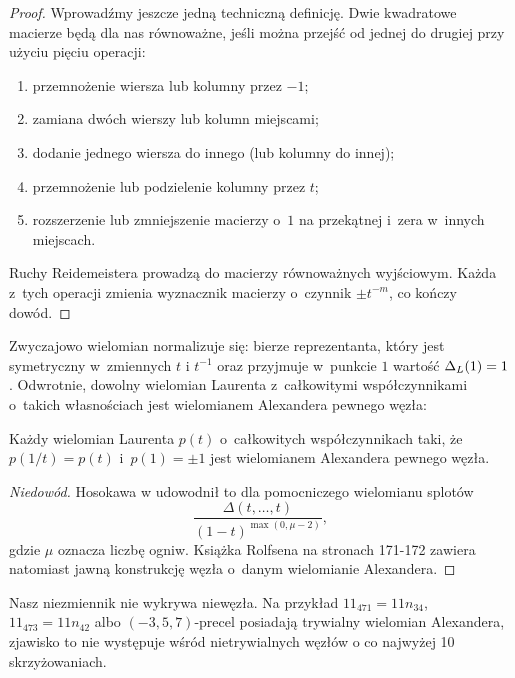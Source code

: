 \begin{proof}
    Wprowadźmy jeszcze jedną techniczną definicję.
    Dwie kwadratowe macierze będą dla nas równoważne, jeśli można przejść od jednej do drugiej przy użyciu pięciu operacji:
    \begin{enumerate}
        \item przemnożenie wiersza lub kolumny przez $-1$;
        \item zamiana dwóch wierszy lub kolumn miejscami;
        \item dodanie jednego wiersza do innego (lub kolumny do innej);
        \item przemnożenie lub podzielenie kolumny przez $t$;
        \item rozszerzenie lub zmniejszenie macierzy o~$1$ na przekątnej i~zera w~innych miejscach.
    \end{enumerate}

    Ruchy Reidemeistera prowadzą do macierzy równoważnych wyjściowym.
    Każda z~tych operacji zmienia wyznacznik macierzy o~czynnik $\pm t^{-m}$, co kończy dowód.
\end{proof}

Zwyczajowo wielomian normalizuje się: bierze reprezentanta, który jest symetryczny w~zmiennych $t$ i $t^{-1}$ oraz przyjmuje w~punkcie $1$ wartość $\Delta_L(1) = 1$.
Odwrotnie, dowolny wielomian Laurenta z~całkowitymi współczynnikami o~takich własnościach jest wielomianem Alexandera pewnego węzła:

\begin{proposition}
\label{prp:alexander_hosokawa}%
    Każdy wielomian Laurenta $p(t)$ o~całkowitych współczynnikach taki, że $p(1/t) = p(t)$ i~$p(1) = \pm 1$ jest wielomianem Alexandera pewnego węzła.
\end{proposition}

\begin{proof}[Niedowód]
    Hosokawa w \cite{hosokawa58} udowodnił to dla pomocniczego wielomianu splotów
    \begin{equation}
        \frac{\Delta(t, \ldots, t)}{(1-t)^{\max(0, \mu - 2)}},
    \end{equation}
    gdzie $\mu$ oznacza liczbę ogniw.
    Książka \cite{rolfsen76} Rolfsena na stronach 171-172 zawiera natomiast jawną konstrukcję węzła o~danym wielomianie Alexandera.
\end{proof}

Nasz niezmiennik nie wykrywa niewęzła.
Na przykład $11_{471} = 11n_{34}$, $11_{473} = 11n_{42}$ albo $(-3, 5, 7)$-precel posiadają trywialny wielomian Alexandera, zjawisko to nie występuje wśród nietrywialnych węzłów o co najwyżej 10 skrzyżowaniach.

